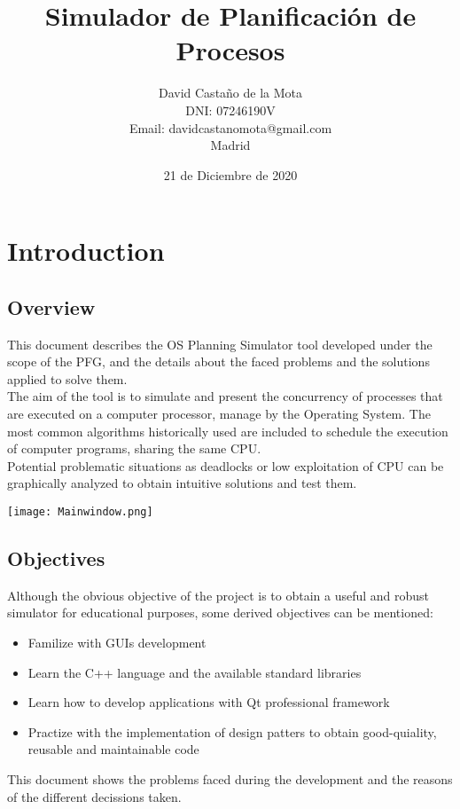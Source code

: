 \documentclass{report}
\title{\Huge Simulador de Planificación de Procesos}
\author{David Castaño de la Mota \\ DNI: 07246190V \\ Email: davidcastanomota@gmail.com\\Madrid}
\date{21 de Diciembre de 2020}
\begin{document}
\maketitle

\tableofcontents{}


\chapter{Introduction}
    \section{Overview}
        This document describes the OS Planning Simulator tool developed under the scope of the PFG, and the details about the faced problems and the solutions applied to solve them.\\
        The aim of the tool is to simulate and present the concurrency of processes that are executed on a computer processor, manage by the Operating System. The most common algorithms historically used are included to schedule the execution of computer programs, sharing the same CPU.\\
        Potential problematic situations as deadlocks or low exploitation of CPU can be graphically analyzed to obtain intuitive solutions and test them.
        \begin{center}
            \texttt{[image: Mainwindow.png]}
        \end{center} 
 \section{Objectives}
        Although the obvious objective of the project is to obtain a useful and robust simulator for educational purposes, some derived objectives can be mentioned:
        \begin{itemize}
            \item Familize with GUIs development
            \item Learn the C++ language and the available standard libraries
            \item Learn how to develop applications with Qt professional framework
            \item Practize with the implementation of design patters to obtain good-quiality, reusable and maintainable code
        \end{itemize}
        This document shows the problems faced during the development and the reasons of the different decissions taken.\\
\end{document}
